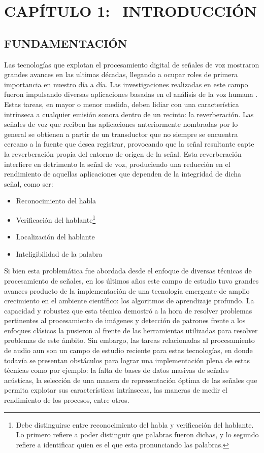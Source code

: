 \section[Introducción]{CAPÍTULO 1:$\ \ \ \ $INTRODUCCIÓN} 

\subsection[Fundamentación]{FUNDAMENTACIÓN}
Las tecnologías que explotan el procesamiento digital de señales de voz mostraron grandes avances en las ultimas décadas, llegando a ocupar roles de primera importancia en nuestro día a día. Las investigaciones realizadas en este campo fueron impulsando diversas aplicaciones basadas en el análisis de la voz humana \cite{fun1}\cite{fun2}. 
Estas tareas, en mayor o menor medida, deben lidiar con una característica intrínseca a cualquier emisión sonora dentro de un recinto: la reverberación. Las señales de voz que reciben las aplicaciones anteriormente nombradas por lo general se obtienen a partir de un transductor que no siempre se encuentra cercano a la fuente que desea registrar, provocando que la señal resultante capte la reverberación propia del entorno de origen de la señal. Esta reverberación interfiere en detrimento la señal de voz, produciendo una reducción en el rendimiento de aquellas aplicaciones que dependen de la integridad de dicha señal, como ser: 

\begin{itemize}
    \item Reconocimiento del habla \cite{reconocimiento}
    \item Verificación del hablante\footnote{Debe distinguirse entre reconocimiento del habla y verificación del hablante. Lo primero refiere a poder distinguir que palabras fueron dichas, y lo segundo refiere a identificar quien es el que esta pronunciando las palabras.} \cite{verificacion}
    
    \item Localización del hablante \cite{localizacion}
    \item Inteligibilidad de la palabra
\end{itemize}


Si bien esta problemática fue abordada desde el enfoque de diversas técnicas de procesamiento de señales, en los últimos años este campo de estudio tuvo grandes avances producto de la implementación de una tecnología emergente de amplio crecimiento en el ambiente científico: los algoritmos de aprendizaje profundo. La capacidad y robustez que esta técnica demostró a la hora de resolver problemas pertinentes al procesamiento de imágenes y detección de patrones frente a los enfoques clásicos la pusieron al frente de las herramientas utilizadas para resolver problemas de este ámbito. Sin embargo, las tareas relacionadas al procesamiento de audio aun son un campo de estudio reciente para estas tecnologías, en donde todavía se presentan obstáculos para lograr una implementación plena de estas técnicas como por ejemplo: la falta de bases de datos masivas de señales acústicas, la selección de una manera de representación óptima de las señales que permita explotar sus características intrínsecas, las maneras de medir el rendimiento de los procesos, entre otros.

